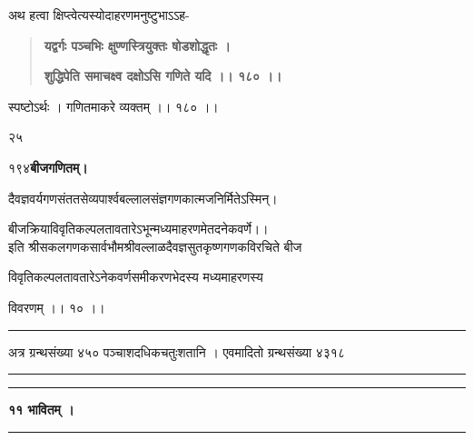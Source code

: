 \documentclass[11pt, openany]{book}
\begin{document}
\begin{sloppypar}
\hangindent=0.2in \hspace{0.2in}अथ हत्वा क्षिप्त्वेत्यस्योदाहरणमनुष्टुभाऽऽह- 

\begin{quote}
\hspace{1in}\textbf{यद्वर्गः पञ्चभिः क्षुण्णस्त्रियुक्तः षोडशोद्धृतः ।}

\hspace{1in}\textbf{शुद्धिपेति समाचक्ष्व दक्षोऽसि गणिते यदि ।। १८० ।।}
\end{quote}

\hangindent=0.2in \hspace{0.2in}स्पष्टोऽर्थः । गणितमाकरे व्यक्तम् ।। १८० ।। 

\hspace{0.5in}२५
\end{sloppypar}
\thispagestyle{empty}
\newpage

\onehalfspacing
१९४\hspace{2in}\textbf{बीजगणितम्।} 

\vspace{5mm}

\begin{sloppypar}
\begin{center}
दैवज्ञवर्यगणसंततसेव्यपार्श्वबल्लालसंज्ञगणकात्मजनिर्मितेऽस्मिन्।

बीजक्रियाविवृतिकल्पलतावतारेऽभून्मध्यमाहरणमेतदनेकवर्णे।।\\

इति श्रीसकलगणकसार्वभौमश्रीवल्लाळदैवज्ञसुतकृष्णगणकविरचिते बीज

विवृतिकल्पलतावतारेऽनेकवर्णसमीकरणभेदस्य मध्यमाहरणस्य 

विवरणम् ।। १० ।।

\rule{0.1\linewidth}{0.5pt}

\vspace{2cm}

अत्र ग्रन्थसंख्या ४५० पञ्चाशदधिकचतुःशतानि । एवमादितो ग्रन्थसंख्या ४३१८

\vspace{2cm}

\rule{0.1\linewidth}{0.5pt}

\vspace{-5mm}

\rule{0.1\linewidth}{0.5pt}
\end{center}
\end{sloppypar}
\thispagestyle{empty}
\newpage

\onehalfspacing
\begin{center}
    \textbf{\large ११ भावितम् ।}
    
    \rule{0.1\linewidth}{0.5pt}
\end{center}
\end{document}
